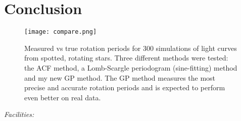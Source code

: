 \documentclass[11pt,preprint]{aastex}
\newcommand{\figlabel}[1]{\label{fig:#1}}
\begin{document}
\section{Conclusion}

\begin{figure}[p]
\begin{center}
\texttt{[image: compare.png]}
\end{center}
\caption{%
Measured vs true rotation periods for 300 simulations of light curves from
spotted, rotating stars.
Three different methods were tested: the ACF method, a Lomb-Scargle
periodogram (sine-fitting) method and my new GP method.
The GP method measures the most precise and accurate rotation periods
and is expected to perform even better on real data.
\figlabel{rotation}}
\end{figure}

{\it Facilities:} 

% 
\end{document}
